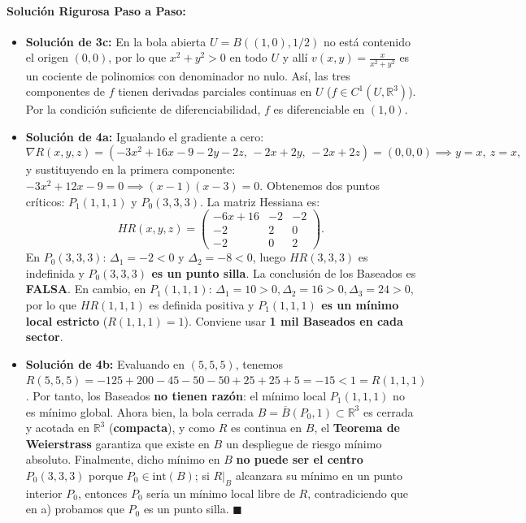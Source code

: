 \documentclass[11pt,a4paper]{article}
\begin{document}
\paragraph{Solución Rigurosa Paso a Paso:}
\begin{itemize}[leftmargin=1.5em]
  \item \textbf{Solución de 3c:} En la bola abierta $U = B((1,0), 1/2)$ no está contenido el origen $(0,0)$, por lo que $x^2+y^2 > 0$ en todo $U$ y allí $v(x,y) = \frac{x}{x^2+y^2}$ es un cociente de polinomios con denominador no nulo. Así, las tres componentes de $f$ tienen derivadas parciales continuas en $U$ ($f \in C^1(U, \mathbb{R}^3)$). Por la condición suficiente de diferenciabilidad, $f$ es diferenciable en $(1,0)$.
  \item \textbf{Solución de 4a:} Igualando el gradiente a cero:
  \[ \nabla R(x,y,z) = (-3x^2 + 16x - 9 - 2y - 2z, \, -2x + 2y, \, -2x + 2z) = (0,0,0) \implies y = x, \ z = x, \]
  y sustituyendo en la primera componente: $-3x^2 + 12x - 9 = 0 \implies (x-1)(x-3) = 0$. Obtenemos dos puntos críticos: $P_1(1,1,1)$ y $P_0(3,3,3)$. La matriz Hessiana es:
  \[ HR(x,y,z) = \begin{pmatrix} -6x+16 & -2 & -2 \\ -2 & 2 & 0 \\ -2 & 0 & 2 \end{pmatrix}. \]
  En $P_0(3,3,3)$: $\Delta_1 = -2 < 0$ y $\Delta_2 = -8 < 0$, luego $HR(3,3,3)$ es indefinida y \textbf{$P_0(3,3,3)$ es un punto silla}. La conclusión de los Baseados es \textbf{FALSA}. En cambio, en $P_1(1,1,1)$: $\Delta_1 = 10 > 0, \Delta_2 = 16 > 0, \Delta_3 = 24 > 0$, por lo que $HR(1,1,1)$ es definida positiva y \textbf{$P_1(1,1,1)$ es un mínimo local estricto} ($R(1,1,1)=1$). Conviene usar \textbf{1 mil Baseados en cada sector}.
  \item \textbf{Solución de 4b:} Evaluando en $(5,5,5)$, tenemos $R(5,5,5) = -125 + 200 - 45 - 50 - 50 + 25 + 25 + 5 = -15 < 1 = R(1,1,1)$. Por tanto, los Baseados \textbf{no tienen razón}: el mínimo local $P_1(1,1,1)$ no es mínimo global. Ahora bien, la bola cerrada $B = \overline{B}(P_0, 1) \subset \mathbb{R}^3$ es cerrada y acotada en $\mathbb{R}^3$ (\textbf{compacta}), y como $R$ es continua en $B$, el \textbf{Teorema de Weierstrass} garantiza que existe en $B$ un despliegue de riesgo mínimo absoluto. Finalmente, dicho mínimo en $B$ \textbf{no puede ser el centro $P_0(3,3,3)$} porque $P_0 \in \text{int}(B)$; si $R|_B$ alcanzara su mínimo en un punto interior $P_0$, entonces $P_0$ sería un mínimo local libre de $R$, contradiciendo que en a) probamos que $P_0$ es un punto silla. $\blacksquare$
\end{itemize}
\end{document}
